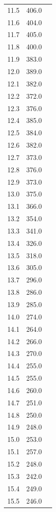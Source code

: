 \begin{minipage}{\linewidth}
\begin{table}[H]
\begin{tabular}{lll}
        11.5	& 406.0 \\
        11.6	& 404.0 \\
        11.7	& 405.0 \\
        11.8	& 400.0 \\
        11.9	& 383.0 \\
        12.0	& 389.0 \\
        12.1	& 382.0 \\
        12.2	& 372.0 \\
        12.3	& 376.0 \\
        12.4	& 385.0 \\
        12.5	& 384.0 \\
        12.6	& 382.0 \\
        12.7	& 373.0 \\
        12.8	& 376.0 \\
        12.9	& 373.0 \\
        13.0	& 375.0 \\
        13.1	& 366.0 \\
        13.2	& 354.0 \\
        13.3	& 341.0 \\
        13.4	& 326.0 \\
        13.5	& 318.0 \\
        13.6	& 305.0 \\
        13.7	& 296.0 \\
        13.8	& 286.0 \\
        13.9	& 285.0 \\
        14.0	& 274.0 \\
        14.1	& 264.0 \\
        14.2	& 266.0 \\
        14.3	& 270.0 \\
        14.4	& 255.0 \\
        14.5	& 255.0 \\
        14.6	& 260.0 \\
        14.7	& 251.0 \\
        14.8	& 250.0 \\
        14.9	& 248.0 \\
        15.0	& 253.0 \\
        15.1	& 257.0 \\
        15.2	& 248.0 \\
        15.3	& 242.0 \\
        15.4	& 249.0 \\
        15.5	& 246.0 \\

\end{tabular}
\end{table}
\end{minipage}
